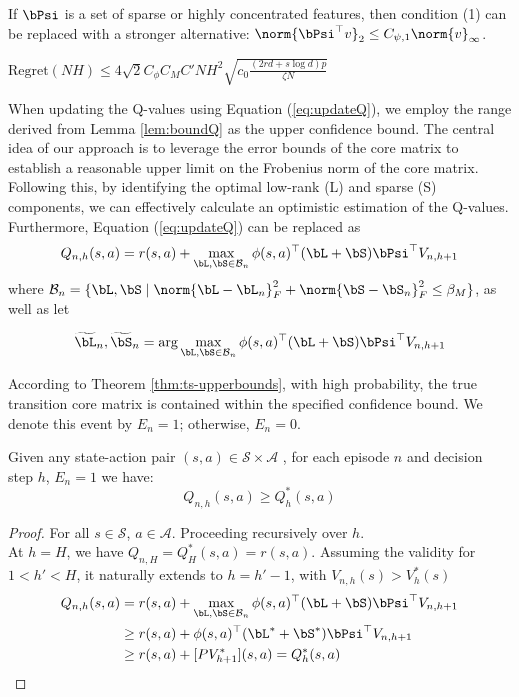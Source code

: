   If $\bPsi$ is a set of sparse or highly concentrated features, then condition (1) can be replaced with a stronger alternative: $\norm{\bPsi^{\top} v}_2 \leq C_{\psi,1} \norm{v}_{\infty}$.

  \begin{theorem}
$\text{Regret}(NH) \leq 4\sqrt{2}C_{\phi}C_{M}C'NH^2\sqrt{c_0\frac{(2rd+s\log d)p}{\zeta N}}$
\label{thm:rl-theorem}
\end{theorem}

  When updating the Q-values using Equation (\ref{eq:updateQ}), we employ the range derived from Lemma \ref{lem:boundQ} as the upper confidence bound. The central idea of our approach is to leverage the error bounds of the core matrix to establish a reasonable upper limit on the Frobenius norm of the core matrix. Following this, by identifying the optimal low-rank (L) and sparse (S) components, we can effectively calculate an optimistic estimation of the Q-values.  Furthermore, Equation (\ref{eq:updateQ}) can be replaced as 
    $$Q_{n, h}(s, a) = r(s, a) + \max_{\substack{\bL,\bS \in \mathcal{B}_n}}\phi(s, a)^{\top} (\bL+\bS) \bPsi^{\top} V_{n, h+1}$$
    where $\mathcal{B}_n=\{\bL,\bS \mid \norm{\bL-\bL_n}_F^2+\norm{\bS-\bS_n}_F^2\leq \beta_M\}$, as well as let 

    $$\widetilde{\bL}_n,\widetilde{\bS}_n=\arg\max_{\substack{\bL,\bS \in \mathcal{B}_n}}\phi(s, a)^{\top} (\bL+\bS) \bPsi^{\top} V_{n, h+1}$$

    According to Theorem \ref{thm:ts-upperbounds}, with high probability, the true transition core matrix is contained within the specified confidence bound. We denote this event by $E_n = 1$; otherwise, $E_n=0$.
    
    \begin{lemma}\label{lem:optimism}
    Given any state-action pair $(s, a) \in \mathcal{S} \times \mathcal{A}$ , for each episode $n$ and decision step $h$, $E_n=1$ we have:
        $$Q_{n,h}(s, a) \geq Q_h^*(s, a)$$
    \end{lemma}
    \begin{proof}
    For all $s\in \mathcal{S}$, $a\in \mathcal{A}$. Proceeding recursively over $h$.\\
    At $h=H$, we have $Q_{n,H}=Q_H^*(s, a)=r(s,a)$. Assuming the validity for $1<h'<H$, it naturally extends to $h=h'-1$, with $V_{n,h}(s)>V_h^*(s)$ 
    \begin{align*}
     Q_{n, h}(s, a) 
     &= r(s, a) + \max_{\substack{\bL,\bS \in \mathcal{B}_n}}\phi(s, a)^{\top} (\bL+\bS) \bPsi^{\top} V_{n, h+1}\\
     &\geq r(s, a) + \phi(s, a)^{\top} (\bL^*+\bS^*) \bPsi^{\top} V_{n, h+1}\\
     &\geq r(s, a) + [P V^*_{h+1}](s, a)=Q_h^*(s, a)
    \end{align*}
   \end{proof} 

